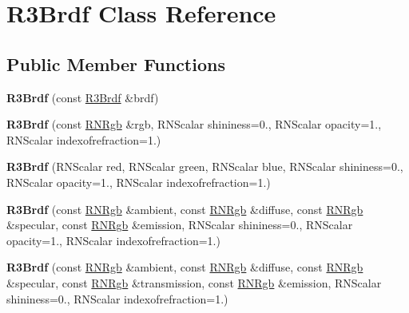 \hypertarget{class_r3_brdf}{}\section{R3\+Brdf Class Reference}
\label{class_r3_brdf}
\subsection*{Public Member Functions}
\begin{DoxyCompactItemize}
\item 
{\bfseries R3\+Brdf} (const \hyperlink{class_r3_brdf}{R3\+Brdf} \&brdf)\hypertarget{class_r3_brdf_af9356f7865445df7289cb70df49fc224}{}\label{class_r3_brdf_af9356f7865445df7289cb70df49fc224}

\item 
{\bfseries R3\+Brdf} (const \hyperlink{class_r_n_rgb}{R\+N\+Rgb} \&rgb, R\+N\+Scalar shininess=0., R\+N\+Scalar opacity=1., R\+N\+Scalar indexofrefraction=1.)\hypertarget{class_r3_brdf_a57515b7fc7531baae357780519cc5c3c}{}\label{class_r3_brdf_a57515b7fc7531baae357780519cc5c3c}

\item 
{\bfseries R3\+Brdf} (R\+N\+Scalar red, R\+N\+Scalar green, R\+N\+Scalar blue, R\+N\+Scalar shininess=0., R\+N\+Scalar opacity=1., R\+N\+Scalar indexofrefraction=1.)\hypertarget{class_r3_brdf_ab78895e436d411f4182aa2adf018149b}{}\label{class_r3_brdf_ab78895e436d411f4182aa2adf018149b}

\item 
{\bfseries R3\+Brdf} (const \hyperlink{class_r_n_rgb}{R\+N\+Rgb} \&ambient, const \hyperlink{class_r_n_rgb}{R\+N\+Rgb} \&diffuse, const \hyperlink{class_r_n_rgb}{R\+N\+Rgb} \&specular, const \hyperlink{class_r_n_rgb}{R\+N\+Rgb} \&emission, R\+N\+Scalar shininess=0., R\+N\+Scalar opacity=1., R\+N\+Scalar indexofrefraction=1.)\hypertarget{class_r3_brdf_a1ef52495ab0ed04d5d477f4bf53fc282}{}\label{class_r3_brdf_a1ef52495ab0ed04d5d477f4bf53fc282}

\item 
{\bfseries R3\+Brdf} (const \hyperlink{class_r_n_rgb}{R\+N\+Rgb} \&ambient, const \hyperlink{class_r_n_rgb}{R\+N\+Rgb} \&diffuse, const \hyperlink{class_r_n_rgb}{R\+N\+Rgb} \&specular, const \hyperlink{class_r_n_rgb}{R\+N\+Rgb} \&transmission, const \hyperlink{class_r_n_rgb}{R\+N\+Rgb} \&emission, R\+N\+Scalar shininess=0., R\+N\+Scalar indexofrefraction=1.)\hypertarget{class_r3_brdf_a474c183231e8e75b0567b40e6cbe6852}{}\label{class_r3_brdf_a474c183231e8e75b0567b40e6cbe6852}


\end{DoxyCompactItemize}
